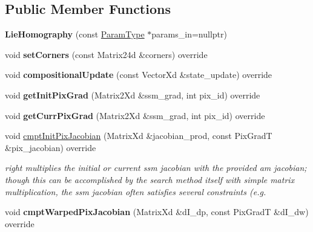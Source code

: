 \subsection*{Public Member Functions}
\begin{DoxyCompactItemize}
\item 
\hypertarget{classLieHomography_a01ab57ea6f24a99b3b8774489322875d}{{\bfseries Lie\-Homography} (const \hyperlink{structLieHomographyParams}{Param\-Type} $\ast$params\-\_\-in=nullptr)}\label{classLieHomography_a01ab57ea6f24a99b3b8774489322875d}

\item 
\hypertarget{classLieHomography_a720e62f9f5aadec738238c296d22c8c9}{void {\bfseries set\-Corners} (const Matrix24d \&corners) override}\label{classLieHomography_a720e62f9f5aadec738238c296d22c8c9}

\item 
\hypertarget{classLieHomography_a6d3d0f5d4f7ae3eb98f0c7569da7c358}{void {\bfseries compositional\-Update} (const Vector\-Xd \&state\-\_\-update) override}\label{classLieHomography_a6d3d0f5d4f7ae3eb98f0c7569da7c358}

\item 
\hypertarget{classLieHomography_ad34b258aeaa1949df61eb090ff30a3fd}{void {\bfseries get\-Init\-Pix\-Grad} (Matrix2\-Xd \&ssm\-\_\-grad, int pix\-\_\-id) override}\label{classLieHomography_ad34b258aeaa1949df61eb090ff30a3fd}

\item 
\hypertarget{classLieHomography_a33c5d7fb2748c795b7ec9ccb1e50054d}{void {\bfseries get\-Curr\-Pix\-Grad} (Matrix2\-Xd \&ssm\-\_\-grad, int pix\-\_\-id) override}\label{classLieHomography_a33c5d7fb2748c795b7ec9ccb1e50054d}

\item 
void \hyperlink{classLieHomography_af27ac56fd834a994901949548db721ff}{cmpt\-Init\-Pix\-Jacobian} (Matrix\-Xd \&jacobian\-\_\-prod, const Pix\-Grad\-T \&pix\-\_\-jacobian) override
\begin{DoxyCompactList}\small\item\em right multiplies the initial or current ssm jacobian with the provided am jacobian; though this can be accomplished by the search method itself with simple matrix multiplication, the ssm jacobian often satisfies several constraints (e.\-g. \end{DoxyCompactList}\item 
\hypertarget{classLieHomography_a3908d623952e7850f3b61fcf338c5d73}{void {\bfseries cmpt\-Warped\-Pix\-Jacobian} (Matrix\-Xd \&d\-I\-\_\-dp, const Pix\-Grad\-T \&d\-I\-\_\-dw) override}\label{classLieHomography_a3908d623952e7850f3b61fcf338c5d73}


\end{DoxyCompactItemize}
